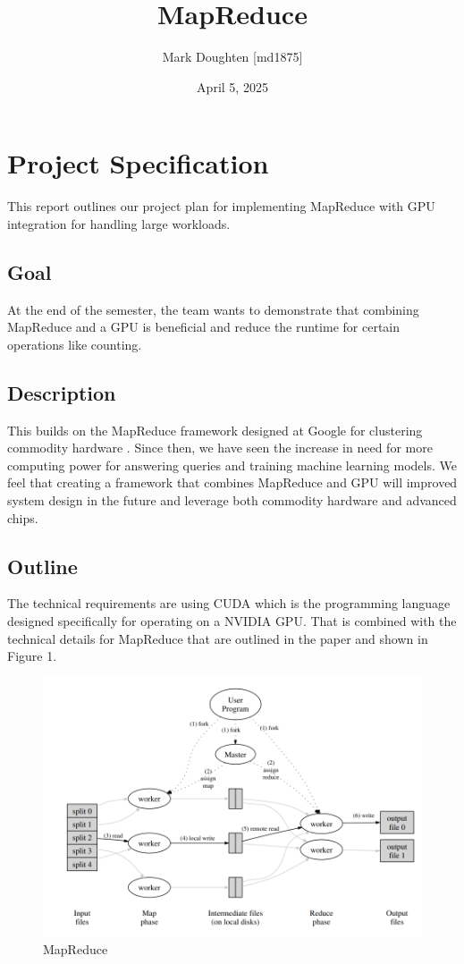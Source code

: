 \documentclass{article}
\title{MapReduce}
\author{Mark Doughten [md1875]}
\date{April 5, 2025}
\begin{document}
\maketitle
\section{Project Specification}

This report outlines our project plan for implementing MapReduce with GPU integration for handling large workloads.

\subsection{Goal}
At the end of the semester, the team wants to demonstrate that combining MapReduce and a GPU is beneficial and reduce the runtime for certain operations like counting.

\subsection{Description}
This builds on the MapReduce framework designed at Google for clustering commodity hardware \cite{mapreduce}. Since then, we have seen the increase in need for more computing power for answering queries and training machine learning models. We feel that creating a framework that combines MapReduce and GPU will improved system design in the future and leverage both commodity hardware and advanced chips. 

\subsection{Outline}
The technical requirements are using CUDA which is the programming language designed specifically for operating on a NVIDIA GPU. That is combined with the technical details for MapReduce that are outlined in the paper \cite{mapreduce} and shown in Figure 1. 

\begin{figure}[ht]
    \centering
    \includegraphics[width=1\linewidth]{./images/mapreduce.png}
    \caption{MapReduce \cite{mapreduce}}
    \label{fig:chroot}
\end{figure}
\end{document}
